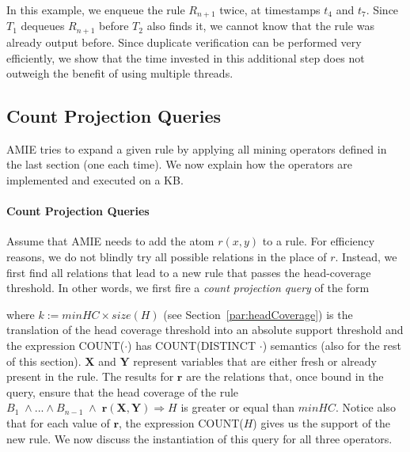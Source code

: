 {In this example, we enqueue the rule $R_{n+1}$ twice, at timestamps $t_4$ and $t_7$.
Since $T_1$ dequeues $R_{n+1}$ before $T_2$ also finds it,
we cannot know that the rule was already output before.
Since duplicate verification
can be performed very efficiently, we show that the time invested in this additional step does not
outweigh the benefit of using multiple threads.
}


\subsection{Count Projection Queries}
\label{subsec:countqueries}

AMIE tries to expand a given rule by applying all mining operators defined in the last section (one each time).
We now explain how the operators are implemented and executed on a KB.

\paragraph{Count Projection Queries}
Assume that AMIE needs to add the atom $r(x,y)$ to a rule.
For efficiency reasons, we do not blindly try all possible relations in the place of $r$. Instead, we first
find all relations that lead to a new rule that passes the head-coverage threshold.
In other words, we first fire a \emph{count projection query} of the form


\noindent where $k := minHC \times size(H)$ (see Section~\ref{par:headCoverage}) is the translation of the
head coverage threshold into an absolute support threshold and the expression COUNT($\cdot$)
has COUNT(DISTINCT $\cdot$) semantics (also for the rest of this section).
$\bm{X}$ and $\bm{Y}$ represent variables that are either fresh or already present in the rule.
The results for $\bm{r}$ are the relations that, once bound in the query,
ensure that the head coverage of the rule $B_1 \; \wedge ... \wedge B_{n-1} \;\wedge\; \bm{r}(\bm{X},\bm{Y}) \Rightarrow H$ is greater
or equal than $minHC$.
Notice also that for each value of $\bm{r}$, the expression COUNT($H$) gives us the support of the new rule.
We now discuss the instantiation of this query for all three operators.

